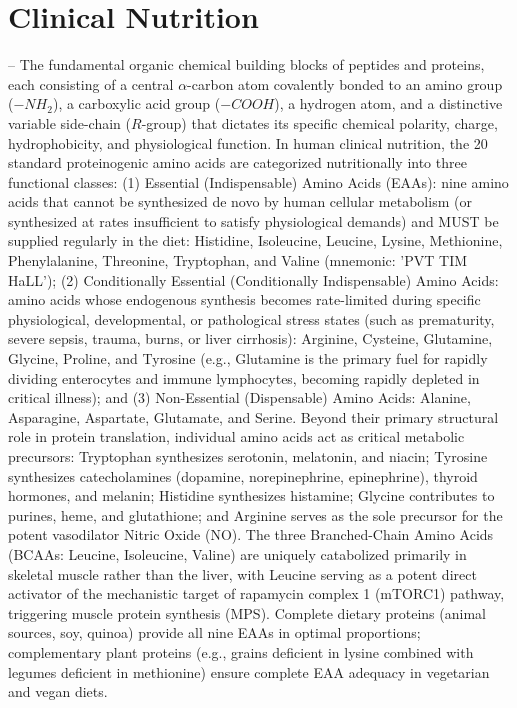 \chapter{Clinical Nutrition}

-- The fundamental organic chemical building blocks of peptides and proteins, each consisting of a central $\alpha$-carbon atom covalently bonded to an amino group ($-NH_2$), a carboxylic acid group ($-COOH$), a hydrogen atom, and a distinctive variable side-chain ($R$-group) that dictates its specific chemical polarity, charge, hydrophobicity, and physiological function. In human clinical nutrition, the 20 standard proteinogenic amino acids are categorized nutritionally into three functional classes: (1) Essential (Indispensable) Amino Acids (EAAs): nine amino acids that cannot be synthesized de novo by human cellular metabolism (or synthesized at rates insufficient to satisfy physiological demands) and MUST be supplied regularly in the diet: Histidine, Isoleucine, Leucine, Lysine, Methionine, Phenylalanine, Threonine, Tryptophan, and Valine (mnemonic: 'PVT TIM HaLL'); (2) Conditionally Essential (Conditionally Indispensable) Amino Acids: amino acids whose endogenous synthesis becomes rate-limited during specific physiological, developmental, or pathological stress states (such as prematurity, severe sepsis, trauma, burns, or liver cirrhosis): Arginine, Cysteine, Glutamine, Glycine, Proline, and Tyrosine (e.g., Glutamine is the primary fuel for rapidly dividing enterocytes and immune lymphocytes, becoming rapidly depleted in critical illness); and (3) Non-Essential (Dispensable) Amino Acids: Alanine, Asparagine, Aspartate, Glutamate, and Serine. Beyond their primary structural role in protein translation, individual amino acids act as critical metabolic precursors: Tryptophan synthesizes serotonin, melatonin, and niacin; Tyrosine synthesizes catecholamines (dopamine, norepinephrine, epinephrine), thyroid hormones, and melanin; Histidine synthesizes histamine; Glycine contributes to purines, heme, and glutathione; and Arginine serves as the sole precursor for the potent vasodilator Nitric Oxide (NO). The three Branched-Chain Amino Acids (BCAAs: Leucine, Isoleucine, Valine) are uniquely catabolized primarily in skeletal muscle rather than the liver, with Leucine serving as a potent direct activator of the mechanistic target of rapamycin complex 1 (mTORC1) pathway, triggering muscle protein synthesis (MPS). Complete dietary proteins (animal sources, soy, quinoa) provide all nine EAAs in optimal proportions; complementary plant proteins (e.g., grains deficient in lysine combined with legumes deficient in methionine) ensure complete EAA adequacy in vegetarian and vegan diets.

